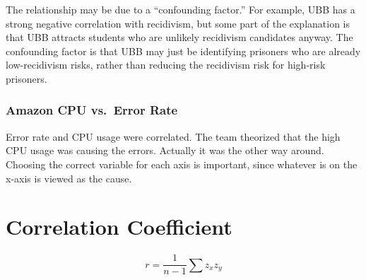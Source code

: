 \documentclass[landscape]{exam}
\begin{document}
  The relationship may be due to a ``confounding factor.''  For example, UBB
  has a strong negative correlation with recidivism, but some part of the
  explanation is that UBB attracts students who are unlikely recidivism
  candidates anyway.   The confounding factor is that UBB may just be
  identifying prisoners who are already low-recidivism risks, rather than
  reducing the recidivism risk for high-risk prisoners.

  \subsubsection{Amazon CPU vs.\ Error Rate} %

  Error rate and CPU usage were correlated. The team theorized that the high
  CPU usage was causing the errors. Actually it was the other way around.
  Choosing the correct variable for each axis is important, since whatever is on
  the x-axis is viewed as the cause.
  

  

  \section{Correlation Coefficient}
  \[
    r = \frac{1}{n - 1} \sum z_x z_y
  \]
\end{document}
